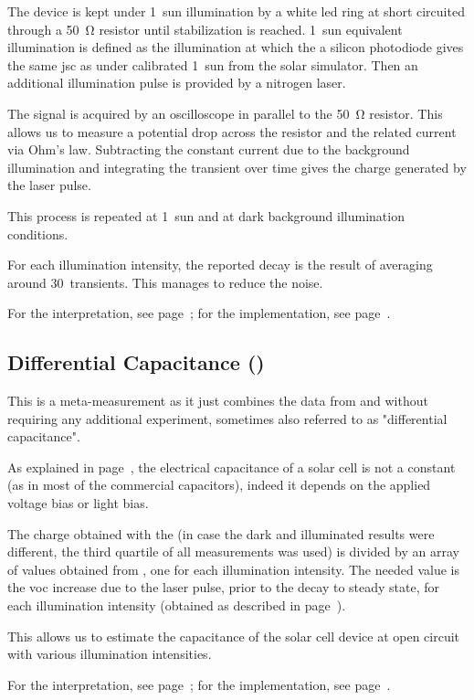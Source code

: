 		The device is kept under 1~sun illumination by a white \gls{led} ring at short circuited through a \SI{50}{\ohm} resistor until stabilization is reached. 1~sun equivalent illumination is defined as the illumination at which the a silicon photodiode gives the same \gls{jsc} as under calibrated 1~sun from the solar simulator. Then an additional illumination pulse is provided by a nitrogen laser.

		The signal is acquired by an oscilloscope in parallel to the \SI{50}{\ohm} resistor. This allows us to measure a potential drop across the resistor and the related current via Ohm's law. Subtracting the constant current due to the background illumination and integrating the transient over time gives the charge generated by the laser pulse.

		This process is repeated at 1~sun and at dark background illumination conditions.

		For each illumination intensity, the reported decay is the result of averaging around 30~transients. This manages to reduce the noise.
		
		For the interpretation, see page~\pageref{interpretation_tpc}; for the implementation, see page~\pageref{r_tpc}.

	\subsection{Differential Capacitance ()}

		This is a meta-measurement as it just combines the data from  and  without requiring any additional experiment\cite{Shuttle2008}, sometimes also referred to as "differential capacitance".

		As explained in page~\pageref{interpretation_dc}, the electrical capacitance of a solar cell is not a constant (as in most of the commercial capacitors), indeed it depends on the applied voltage bias or light bias.

		The charge obtained with the  (in case the dark and illuminated results were different, the third quartile of all  measurements was used) is divided by an array of values obtained from , one for each illumination intensity. The needed value is the \gls{voc} increase due to the laser pulse, prior to the decay to steady state, for each illumination intensity (obtained as described in page~\pageref{tpv_deltaV}).

		This allows us to estimate the capacitance of the solar cell device at open circuit with various illumination intensities.

		For the interpretation, see page~\pageref{interpretation_tpc}; for the implementation, see page~\pageref{r_tpc}.